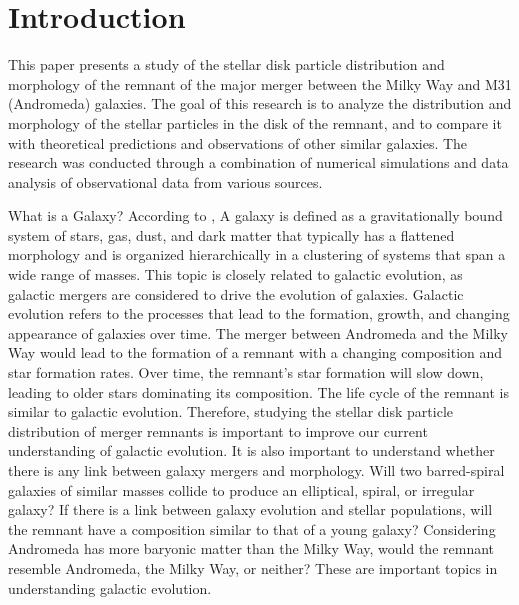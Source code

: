 \documentclass[preprint2, times]{aastex631}
\begin{document}
\section{Introduction} \label{sec:style}
This paper presents a study of the stellar disk particle distribution and morphology of the remnant of the major merger between the Milky Way and M31 (Andromeda) galaxies. The goal of this research is to analyze the distribution and morphology of the stellar particles in the disk of the remnant, and to compare it with theoretical predictions and observations of other similar galaxies. The research was conducted through a combination of numerical simulations and data analysis of observational data from various sources.\par
What is a Galaxy? According to \citet{Willman_2012}, A galaxy is defined as a gravitationally bound system of stars, gas, dust, and dark matter that typically has a flattened morphology and is organized hierarchically in a clustering of systems that span a wide range of masses. 
This topic is closely related to galactic evolution, as galactic mergers are considered to drive the evolution of galaxies. Galactic evolution refers to the processes that lead to the formation, growth, and changing appearance of galaxies over time.
The merger between Andromeda and the Milky Way would lead to the formation of a remnant with a changing composition and star formation rates.  
Over time, the remnant's star formation will slow down, leading to older stars dominating its composition. The life cycle of the remnant is similar to galactic evolution. Therefore, studying the stellar disk particle distribution of merger remnants is important to improve our current understanding of galactic evolution. It is also important to understand whether there is 
any link between galaxy mergers and morphology. Will two barred-spiral galaxies of similar masses collide to produce an elliptical, spiral, or irregular galaxy? If there is a link between galaxy evolution and stellar populations, will the remnant have a composition similar to that of a young galaxy? Considering Andromeda has more baryonic matter than the Milky Way, would the remnant resemble Andromeda, the Milky Way, or neither? These are important topics in understanding
galactic evolution.\par
\end{document}
